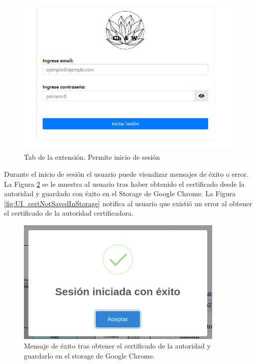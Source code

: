 \documentclass[12pt, a4paper, titlepage]{report}
\begin{document}
    		    \begin{figure}[H]
    				\begin{center}	\includegraphics[width=12cm]{./imagenes/Disenio/Componente_1/UI_webpage.PNG}
    					\caption{Tab de la extensión. Permite inicio de sesión}
    					\label{fig:CI_Tab}
    				\end{center}
    			\end{figure}
    			
    			Durante el inicio de sesión el usuario puede visualizar mensajes de éxito o error. La Figura \ref{fig:UI_certSavedInStorage} se le muestra al usuario tras haber obtenido el certificado desde la autoridad y guardado con éxito en el Storage de Google Chrome. La Figura \ref{fig:UI_certNotSavedInStorage} notifica al usuario que existió un error al obtener el certificado de la autoridad certificadora. 
    			
    			\begin{figure}[H]
    				\begin{center}	\includegraphics[width=10cm]{./imagenes/Disenio/Componente_1/UI_certSavedInStorage.PNG}
    					\caption[Mensaje de éxito]{Mensaje de éxito tras obtener el certificado de la autoridad y guardarlo en el storage de Google Chrome.}
    				\label{fig:UI_certSavedInStorage}
    				\end{center}
    			\end{figure}
    			
\end{document}
